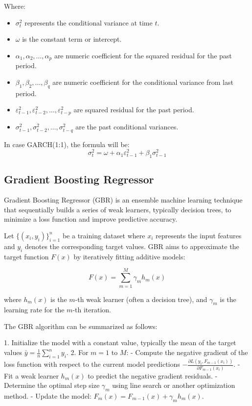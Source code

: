 \documentclass{ieeeojies}
\begin{document}
Where:
\begin{itemize}
  \item \(\sigma^2_t\) represents the conditional variance at time \(t\).
  \item \(\omega\) is the constant term or intercept.
  \item \(\alpha_1, \alpha_2, \ldots, \alpha_p\) are numeric coefficient for the squared residual for the past period.
  \item \(\beta_1, \beta_2, \ldots, \beta_q\) are numeric coefficient for the conditional variance from last period.
  \item \(\varepsilon^2_{t-1}, \varepsilon^2_{t-2}, \ldots, \varepsilon^2_{t-p}\) are squared residual for the past period.
  \item \(\sigma^2_{t-1}, \sigma^2_{t-2}, \ldots, \sigma^2_{t-q}\) are the past conditional variances.
\end{itemize}

In case GARCH(1:1), the formula will be:
\[
\sigma^2_t = \omega + \alpha_1 \varepsilon^2_{t-1} + \beta_1 \sigma^2_{t-1}
\]
\subsection{Gradient Boosting Regressor}

Gradient Boosting Regressor (GBR) is an ensemble machine learning technique that sequentially builds a series of weak learners, typically decision trees, to minimize a loss function and improve predictive accuracy.

Let \( \{ (x_i, y_i) \}_{i=1}^n \) be a training dataset where \( x_i \) represents the input features and \( y_i \) denotes the corresponding target values. GBR aims to approximate the target function \( F(x) \) by iteratively fitting additive models:

\[
F(x) = \sum_{m=1}^M \gamma_m h_m(x)
\]

where \( h_m(x) \) is the \( m \)-th weak learner (often a decision tree), and \( \gamma_m \) is the learning rate for the \( m \)-th iteration.

The GBR algorithm can be summarized as follows:

1. Initialize the model with a constant value, typically the mean of the target values \( \bar{y} = \frac{1}{n} \sum_{i=1}^n y_i \).
2. For \( m = 1 \) to \( M \):
   - Compute the negative gradient of the loss function with respect to the current model predictions \( -\frac{\partial L(y_i, F_{m-1}(x_i))}{\partial F_{m-1}(x_i)} \).
   - Fit a weak learner \( h_m(x) \) to predict the negative gradient residuals.
   - Determine the optimal step size \( \gamma_m \) using line search or another optimization method.
   - Update the model: \( F_m(x) = F_{m-1}(x) + \gamma_m h_m(x) \).
\end{document}
